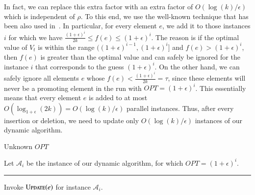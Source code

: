 \documentclass[11pt]{article}
\newcommand{\ceil}[1]{\left\lceil #1 \right\rceil}
\newcommand{\floor}[1]{\left\lfloor #1 \right\rfloor}
\newcommand{\mO}{O}
\newcommand{\update}{\textsc{Update}}
\begin{document}
In fact, we can replace this extra factor with 
an extra factor of $\mO(\log{(k)}/\epsilon)$ which is independent of $\rho$. 
To this end, we use the well-known technique that has been also used in~\cite{DBLP:conf/nips/LattanziMNTZ20}. 
In particular, for every element $e$, we add it to those instances $i$ 
for which we have $\frac{(1+\epsilon)^i}{2k} \leq f(e) \leq (1+\epsilon)^i$.
The reason is if the optimal value of $V_t$ is within the range $((1+\epsilon)^{i-1},(1+\epsilon)^i]$ and 
$f(e) > (1+\epsilon)^i$, then $f(e)$ is greater than the optimal value and can safely be ignored for the instance $i$ 
that corresponds to the guess $(1+\epsilon)^i$. 
On the other hand, we can safely ignore all elements $e$ whose $f(e) < \frac{(1+\epsilon)^i}{2k}=\tau$, 
since these elements will never be a promoting element in the run with $OPT = (1+\epsilon)^i$.
This essentially means that every element $e$ is added to at most 
$\mO(\log_{1+\epsilon}{(2k)}) = \mO(\log{(k)}/\epsilon)$ parallel instances. 
Thus, after every insertion or deletion, 
we need to update only $\mO(\log{(k)}/\epsilon)$ instances of our dynamic algorithm.




\begin{algorithm}[h] 
\caption{Unknown $OPT$} 
\begin{algorithmic}[1]
    \State Let $\mathcal{A}_i$ be the instance of our dynamic algorithm, for which $OPT=(1+\epsilon)^i$.
    
     \rule{15cm}{0.4pt} 
    
        \For{\textbf{each} $i \in \left[\ceil{\log_{1+\epsilon}{f(e)}},\floor{\log_{1+\epsilon}{\left(2k\cdot f(e)\right)}}\right]$} 
            \State Invoke $\update(e)$ for instance $\mathcal{A}_i$.
        \EndFor
    \EndFunction
\end{algorithmic}
\label{alg:cardinality:unknown:opt}
\end{algorithm}




 
\end{document}
